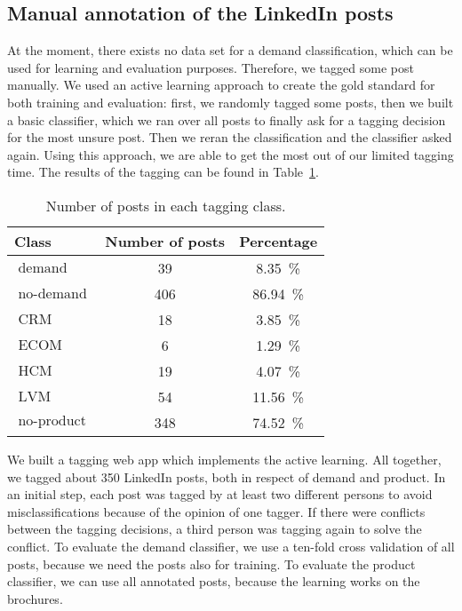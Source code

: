 \subsection{Manual annotation of the LinkedIn posts}

At the moment, there exists no data set for a demand classification, which can be used for learning and evaluation purposes.
Therefore, we tagged some post manually.
We used an active learning \nr approach to create the gold standard for both training and evaluation:
first, we randomly tagged some posts, then we built a basic classifier, which we ran over all posts to finally ask for a tagging decision for the most unsure post.
Then we reran the classification and the classifier asked again.
Using this approach, we are able to get the most out of our limited tagging time.
The results of the tagging can be found in Table~\ref{table:data_overview}.

\begin{table}[h]
	\centering
	\label{table:data_overview}
	{
		\renewcommand\arraystretch{1.25}
		\begin{tabular}{lcc}
			\hline
			\textbf{Class} & \textbf{Number of posts} & \textbf{Percentage} \\
			\hline
			\hline
			$\operatorname{demand}$ & 39 & 8.35~\% \\
			\hline
			$\operatorname{no-demand}$ & 406 & 86.94~\% \\
			\hline
			\hline
			$\operatorname{CRM}$ & 18 & 3.85~\% \\
			\hline
			$\operatorname{ECOM}$ & 6 & 1.29~\% \\
			\hline
			$\operatorname{HCM}$ & 19 & 4.07~\% \\
			\hline
			$\operatorname{LVM}$ & 54 & 11.56~\% \\
			\hline
			$\operatorname{no-product}$ & 348 & 74.52~\% \\
			\hline
		\end{tabular}
	}
	\caption{Number of posts in each tagging class.}
\end{table}

We built a tagging web app which implements the active learning.
All together, we tagged about 350 LinkedIn posts, both in respect of demand and product.
In an initial step, each post was tagged by at least two different persons to avoid misclassifications  because of the opinion of one tagger.
If there were conflicts between the tagging decisions, a third person was tagging again to solve the conflict.
To evaluate the demand classifier, we use a ten-fold cross validation of all posts, because we need the posts also for training.
To evaluate the product classifier, we can use all annotated posts, because the learning works on the brochures.

